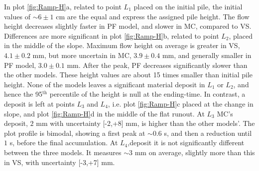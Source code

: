 \documentclass{article}
\begin{document}
In plot \ref{fig:Ramp-H}a, related to point $L_1$ placed on the initial pile, the initial values of $\sim 6\pm 1$ cm are the equal and express the assigned pile height. The flow height decreases slightly faster in PF model, and slower in MC, compared to VS. Differences are more significant in plot \ref{fig:Ramp-H}b, related to point $L_2$, placed in the middle of the slope. Maximum flow height on average is greater in VS, $4.1\pm 0.2$ mm, but more uncertain in MC, $3.9\pm 0.4$ mm, and generally smaller in PF model, $3.0\pm 0.1$ mm. After the peak, PF decreases significantly slower than the other models. These height values are about 15 times smaller than initial pile height. None of the models leaves a significant material deposit in $L_1$ or $L_2$, and hence the 95$^{\mathrm{th}}$ percentile of the height is null at the ending-time. In contrast, a deposit is left at points $L_3$ and $L_4$, i.e. plot \ref{fig:Ramp-H}c placed at the change in slope, and plot \ref{fig:Ramp-H}d in the middle of the flat runout. At $L_3$ MC's deposit, $2$ mm with uncertainty [-2,+8] mm, is higher than the other models'. The plot profile is bimodal, showing a first peak at $\sim 0.6$ s, and then a reduction until $1$ s, before the final accumulation. At $L_4$,deposit it is not significantly different between the three models. It measures $\sim 3$ mm on average, slightly more than this in VS, with uncertainty [-3,+7] mm.
\end{document}
